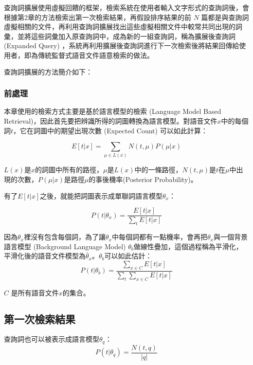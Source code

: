 查詢詞擴展使用虛擬回饋的框架，檢索系統在使用者輸入文字形式的查詢詞後，會根據第2章的方法檢索出第一次檢索結果，再假設排序結果的前 $N$ 篇都是與查詢詞虛擬相關的文件，再利用查詢詞擴展找出這些虛擬相關文件中較常共同出現的詞彙，並將這些詞彙加入原查詢詞中，成為新的一組查詢詞，稱為擴展後查詢詞 (Expanded Query) ，系統再利用擴展後查詢詞進行下一次檢索後將結果回傳給使用者，即為傳統監督式語音文件語意檢索的做法。

查詢詞擴展的方法簡介如下：

\subsubsection{前處理}
\label{sec:preprocessing}
本章使用的檢索方式主要是基於語言模型的檢索 (Language Model Based Retrieval)，因此首先要把辨識所得的詞圖轉換為語言模型。對語音文件$x$中的每個詞$t$，它在詞圖中的期望出現次數 (Expected Count) 可以如此計算：

\begin{equation}
E[t|x] = \sum_{\mu \in L(x)} N(t, \mu)P(\mu|x)
\end{equation}

$L(x)$是$x$的詞圖中所有的路徑，$\mu$是$L(x)$中的一條路徑，$N(t, \mu)$是$t$在$\mu$中出現的次數，$P(\mu|x)$是路徑$\mu$的事後機率(Posterior Probability)。

有了$E[t|x]$之後，就能把詞圖表示成單聯詞語言模型$\theta_x$：

\begin{equation}
P(t|\theta_x) = \frac{E[t|x]}{\sum_tE[t|x]}
\end{equation}

因為$\theta_x$裡沒有包含每個詞，為了讓$\theta_x$中每個詞都有一點機率，會再把$\theta_x$與一個背景語言模型 (Background Language Model) $\theta_b$做線性疊加，這個過程稱為平滑化，平滑化後的語音文件模型為$\bar{\theta}_x$。$\theta_b$可以如此估計：
\begin{equation}
\label{equ:chap3_bgm}
P(t|\theta_b) = \frac{\sum_{x\in C}E[t|x]}{\sum_t\sum_{x\in C}E[t|x]}
\end{equation}

$C$ 是所有語音文件$x$的集合。

\subsection{第一次檢索結果}
\label{sec:chap3_fpr}
查詢詞也可以被表示成語言模型$\theta_q$：
\begin{equation}
P(t|\theta_q) = \frac{N(t, q)}{|q|}
\end{equation}


